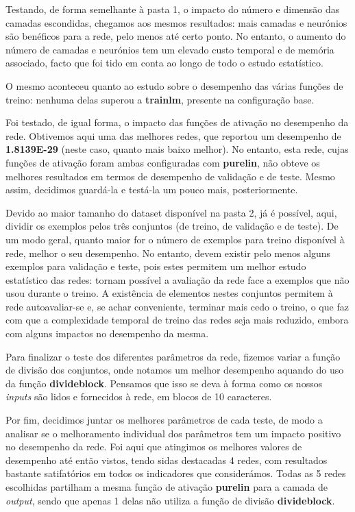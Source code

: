 \documentclass[11pt]{article}
\begin{document}
	Testando, de forma semelhante à pasta 1, o impacto do número e dimensão das camadas escondidas, chegamos aos mesmos resultados: mais camadas e neurónios são benéficos para a rede, pelo menos até certo ponto. No entanto, o aumento do número de camadas e neurónios tem um elevado custo temporal e de memória associado, facto que foi tido em conta ao longo de todo o estudo estatístico.
	
	O mesmo aconteceu quanto ao estudo sobre o desempenho das várias funções de treino: nenhuma delas superou a \textbf{trainlm}, presente na configuração base.
	
	Foi testado, de igual forma, o impacto das funções de ativação no desempenho da rede. Obtivemos aqui uma das melhores redes, que reportou um desempenho de \textbf{1.8139E-29} (neste caso, quanto mais baixo melhor). No entanto, esta rede, cujas funções de ativação foram ambas configuradas com \textbf{purelin}, não obteve os melhores resultados em termos de desempenho de validação e de teste. Mesmo assim, decidimos guardá-la e testá-la um pouco mais, posteriormente.
	
	Devido ao maior tamanho do dataset disponível na pasta 2, já é possível, aqui, dividir os exemplos pelos três conjuntos (de treino, de validação e de teste). De um modo geral, quanto maior for o número de exemplos para treino disponível à rede, melhor o seu desempenho. No entanto, devem existir pelo menos alguns exemplos para validação e teste, pois estes permitem um melhor estudo estatístico das redes: tornam possível a avaliação da rede face a exemplos que não usou durante o treino. A existência de elementos nestes conjuntos permitem à rede autoavaliar-se e, se achar conveniente, terminar mais cedo o treino, o que faz com que a complexidade temporal de treino das redes seja mais reduzido, embora com alguns impactos no desempenho da mesma.
	
	Para finalizar o teste dos diferentes parâmetros da rede, fizemos variar a função de divisão dos conjuntos, onde notamos um melhor desempenho aquando do uso da função \textbf{divideblock}. Pensamos que isso se deva à forma como os nossos \textit{inputs} são lidos e fornecidos à rede, em blocos de 10 caracteres.
	
	Por fim, decidimos juntar os melhores parâmetros de cada teste, de modo a analisar se o melhoramento individual dos parâmetros tem um impacto positivo no desempenho da rede. Foi aqui que atingimos os melhores valores de desempenho até então vistos, tendo sidas destacadas 4 redes, com resultados bastante satifatórios em todos os indicadores que considerámos. Todas as 5 redes escolhidas partilham a mesma função de ativação \textbf{purelin} para a camada de \textit{output}, sendo que apenas 1 delas não utiliza a função de divisão \textbf{divideblock}.
	
\end{document}
